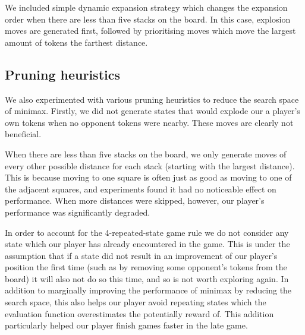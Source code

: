 \documentclass[11pt]{article}
\begin{document}
We included simple dynamic expansion strategy which changes the expansion order when there are less than five stacks on the board. In this case, explosion moves are generated first, followed by prioritising moves which move the largest amount of tokens the farthest distance. 

\subsection{Pruning heuristics}
We also experimented with various pruning heuristics to reduce the search space of minimax. Firstly, we did not generate states that would explode our a player's own tokens when no opponent tokens were nearby. These moves are clearly not beneficial. 

When there are less than five stacks on the board, we only generate moves of every other possible distance for each stack (starting with the largest distance). This is because moving to one square is often just as good as moving to one of the adjacent squares, and experiments found it had no noticeable effect on performance. When more distances were skipped, however, our player's performance was significantly degraded. 

In order to account for the 4-repeated-state game rule we do not consider any state which our player has already encountered in the game. This is under the assumption that if a state did not result in an improvement of our player's position the first time (such as by removing some opponent's tokens from the board) it will also not do so this time, and so is not worth exploring again. In addition to marginally improving the performance of minimax by reducing the search space, this also helps our player avoid repeating states which the evaluation function overestimates the potentially reward of. This addition particularly helped our player finish games faster in the late game.
\end{document}
